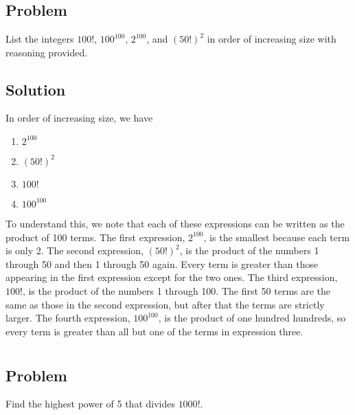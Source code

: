 \documentclass[12pt]{article}
\begin{document}
\section{}

\subsection{Problem}
List the integers $100!$, $100^{100}$, $2^{100}$, and $(50!)^2$ in order of increasing size with reasoning provided.

\subsection{Solution}
In order of increasing size, we have
\begin{enumerate}
    \item $2^{100}$
    \item $(50!)^2$
    \item $100!$
    \item $100^{100}$
\end{enumerate}
To understand this, we note that each of these expressions can be written as the product of 100 terms. The first expression, $2^{100}$, is the smallest because each term is only 2. The second expression, $(50!)^2$, is the product of the numbers 1 through 50 and then 1 through 50 again. Every term is greater than those appearing in the first expression except for the two ones. The third expression, $100!$, is the product of the numbers 1 through 100. The first 50 terms are the same as those in the second expression, but after that the terms are strictly larger. The fourth expression, $100^{100}$, is the product of one hundred hundreds, so every term is greater than all but one of the terms in expression three.



\section{}

\subsection{Problem}
Find the highest power of 5 that divides $1000!$.
\end{document}

